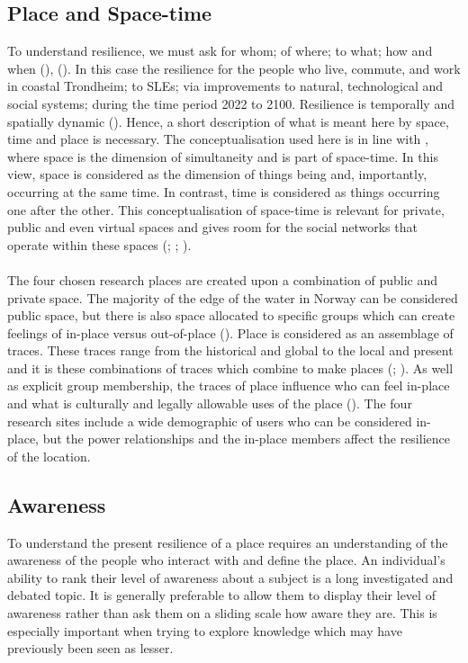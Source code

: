 \subsection{Place and Space-time} 
To understand resilience, we must ask for whom; of where; to what; how and when (\cite{cutter_community_2020}), (\cite{moser_turbulent_2019}). In this case the resilience for the people who live, commute, and work in coastal Trondheim; to SLEs; via improvements to natural, technological and social systems; during the time period 2022 to 2100.  Resilience is temporally and spatially dynamic (\cite{cutter_community_2020}). Hence, a short description of what is meant here by space, time and place is necessary. The conceptualisation used here is in line with \cite{massey_for_2005}, where space is the dimension of simultaneity and is part of space-time. In this view, space is considered as the dimension of things being and, importantly, occurring at the same time. In contrast, time is considered as things occurring one after the other. This conceptualisation of space-time is relevant for private, public and even virtual spaces and gives room for the social networks that operate within these spaces (\cite{massey_for_2005}; \cite{allen_rethinking_1998}; \cite{del_casino_social_2009}).

\paragraph{}
The four chosen research places are created upon a combination of public and private space. The majority of the edge of the water in Norway can be considered public space, but there is also space allocated to specific groups which can create feelings of in-place versus out-of-place (\cite{anderson_understanding_2015}). Place is considered as an assemblage of traces. These traces range from the historical and global to the local and present and it is these combinations of traces which combine to make places (\cite{anderson_understanding_2015}; \cite{massey_for_2005}). As well as explicit group membership, the traces of place influence who can feel in-place and what is culturally and legally allowable uses of the place (\cite{anderson_understanding_2015}). The four research sites include a wide demographic of users who can be considered in-place, but the power relationships and the in-place members affect the resilience of the location. 

\subsection{Awareness}
To understand the present resilience of a place requires an understanding of the awareness of the people who interact with and define the place. An individual’s ability to rank their level of awareness about a subject is a long investigated and debated topic. It is generally preferable to allow them to display their level of awareness rather than ask them on a sliding scale how aware they are. This is especially important when trying to explore knowledge which may have previously been seen as lesser.

